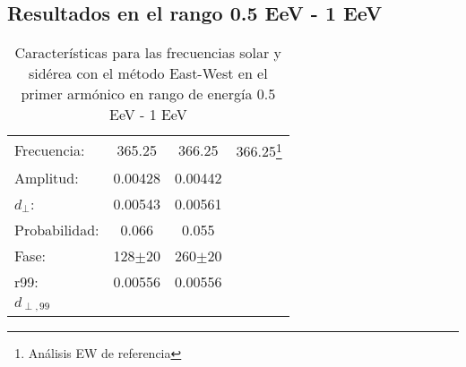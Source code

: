 \subsection*{Resultados en el rango 0.5 EeV - 1 EeV}
    \begin{table}[H]
        \begin{small}
            \begin{center}
                \begin{tabular}[c]{l|c|c|c}
                    Frecuencia:     & 365.25	    & 366.25		& 366.25\footnote{Análisis EW de referencia}\\
                    Amplitud:       & 0.00428       & 0.00442	    & \\
                    $d_\perp$:      & 0.00543       & 0.00561       & \\
                    Probabilidad:   & 0.066         & 0.055	        & \\
                    Fase:           & 128$\pm$20	& 260$\pm$20	& \\
                    r99:            & 0.00556	    & 0.00556       & \\
                    $d_{\perp,99}$  &             &\\
                \end{tabular}
            \end{center}
        \end{small}
        \caption{Características para las frecuencias solar y sidérea con el método East-West en el primer armónico en rango de energía 0.5 EeV - 1 EeV}
        \label{tab:solar}
    \end{table}



